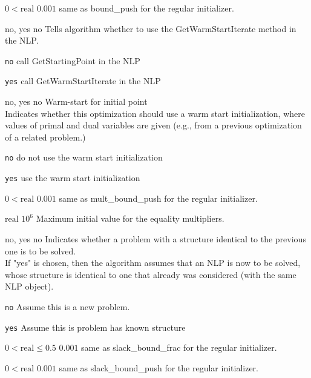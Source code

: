 %
{$0<\textrm{real}$}%
{$0.001$}%
{same as bound\_push for the regular initializer.}%
{}

%
{\ttfamily no, yes}%
{no}%
{Tells algorithm whether to use the GetWarmStartIterate method in the NLP.}%
{\begin{list}{}{
\setlength{\parsep}{0em}
\setlength{\leftmargin}{5ex}
\setlength{\labelwidth}{2ex}
\setlength{\itemindent}{0ex}
\setlength{\topsep}{0pt}}
\item[\texttt{no}] call GetStartingPoint in the NLP
\item[\texttt{yes}] call GetWarmStartIterate in the NLP
\end{list}
}

%
{\ttfamily no, yes}%
{no}%
{Warm-start for initial point\\
Indicates whether this optimization should use a warm start initialization, where values of primal and dual variables are given (e.g., from a previous optimization of a related problem.)}%
{\begin{list}{}{
\setlength{\parsep}{0em}
\setlength{\leftmargin}{5ex}
\setlength{\labelwidth}{2ex}
\setlength{\itemindent}{0ex}
\setlength{\topsep}{0pt}}
\item[\texttt{no}] do not use the warm start initialization
\item[\texttt{yes}] use the warm start initialization
\end{list}
}

%
{$0<\textrm{real}$}%
{$0.001$}%
{same as mult\_bound\_push for the regular initializer.}%
{}

%
{$\textrm{real}$}%
{$10^{  6}$}%
{Maximum initial value for the equality multipliers.}%
{}

%
{\ttfamily no, yes}%
{no}%
{Indicates whether a problem with a structure identical to the previous one is to be solved.\\
If "yes" is chosen, then the algorithm assumes that an NLP is now to be solved, whose structure is identical to one that already was considered (with the same NLP object).}%
{\begin{list}{}{
\setlength{\parsep}{0em}
\setlength{\leftmargin}{5ex}
\setlength{\labelwidth}{2ex}
\setlength{\itemindent}{0ex}
\setlength{\topsep}{0pt}}
\item[\texttt{no}] Assume this is a new problem.
\item[\texttt{yes}] Assume this is problem has known structure
\end{list}
}

%
{$0<\textrm{real}\leq0.5$}%
{$0.001$}%
{same as slack\_bound\_frac for the regular initializer.}%
{}

%
{$0<\textrm{real}$}%
{$0.001$}%
{same as slack\_bound\_push for the regular initializer.}%
{}

